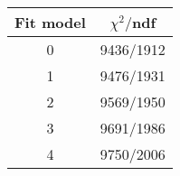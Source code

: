 \begin{tabular}{c|c}
Fit model & $\chi^2/$ndf \\
\hline
0 & 9436/1912\\
1 & 9476/1931\\
2 & 9569/1950\\
3 & 9691/1986\\
4 & 9750/2006\\
\end{tabular}
